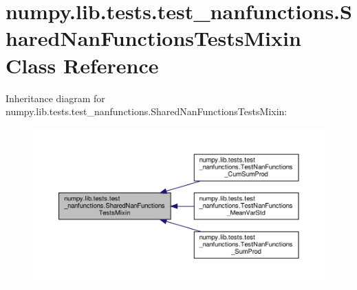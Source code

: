\hypertarget{classnumpy_1_1lib_1_1tests_1_1test__nanfunctions_1_1SharedNanFunctionsTestsMixin}{}\section{numpy.\+lib.\+tests.\+test\+\_\+nanfunctions.\+Shared\+Nan\+Functions\+Tests\+Mixin Class Reference}
\label{classnumpy_1_1lib_1_1tests_1_1test__nanfunctions_1_1SharedNanFunctionsTestsMixin}


Inheritance diagram for numpy.\+lib.\+tests.\+test\+\_\+nanfunctions.\+Shared\+Nan\+Functions\+Tests\+Mixin\+:
\nopagebreak
\begin{figure}[H]
\begin{center}
\leavevmode
\includegraphics[width=350pt]{classnumpy_1_1lib_1_1tests_1_1test__nanfunctions_1_1SharedNanFunctionsTestsMixin__inherit__graph}
\end{center}
\end{figure}
